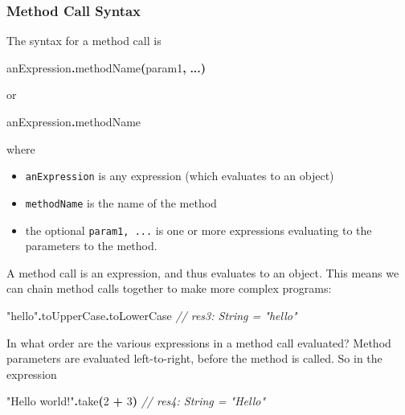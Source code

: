 \documentclass[11pt,a5paper,]{book}
\newenvironment{Shaded}{\begin{snugshade}}{\end{snugshade}}
\newcommand{\CommentTok}[1]{\textcolor[rgb]{0.56,0.35,0.01}{\textit{#1}}}
\newcommand{\DecValTok}[1]{\textcolor[rgb]{0.00,0.00,0.81}{#1}}
\newcommand{\FunctionTok}[1]{\textcolor[rgb]{0.00,0.00,0.00}{#1}}
\newcommand{\NormalTok}[1]{#1}
\newcommand{\OperatorTok}[1]{\textcolor[rgb]{0.81,0.36,0.00}{\textbf{#1}}}
\newcommand{\StringTok}[1]{\textcolor[rgb]{0.31,0.60,0.02}{#1}}
\providecommand{\tightlist}{%
  \setlength{\itemsep}{0pt}\setlength{\parskip}{0pt}}
\begin{document}
\hypertarget{method-call-syntax}{%
\subsubsection*{Method Call Syntax}\label{method-call-syntax}}

The syntax for a method call is

\begin{Shaded}
\begin{Highlighting}[]
\NormalTok{anExpression}\OperatorTok{.}\FunctionTok{methodName}\OperatorTok{(}\NormalTok{param1}\OperatorTok{,} \OperatorTok{...)}
\end{Highlighting}
\end{Shaded}

or

\begin{Shaded}
\begin{Highlighting}[]
\NormalTok{anExpression}\OperatorTok{.}\NormalTok{methodName}
\end{Highlighting}
\end{Shaded}

where

\begin{itemize}
\tightlist
\item
  \texttt{anExpression} is any expression (which evaluates to an object)
\item
  \texttt{methodName} is the name of the method
\item
  the optional \texttt{param1,\ ...} is one or more expressions
  evaluating to the parameters to the method.
\end{itemize}

A method call is an expression, and thus evaluates to an object. This
means we can chain method calls together to make more complex programs:

\begin{Shaded}
\begin{Highlighting}[]
\StringTok{"hello"}\OperatorTok{.}\NormalTok{toUpperCase}\OperatorTok{.}\NormalTok{toLowerCase}
\CommentTok{// res3: String = "hello"}
\end{Highlighting}
\end{Shaded}

In what order are the various expressions in a method call evaluated?
Method parameters are evaluated left-to-right, before the method is
called. So in the expression

\begin{Shaded}
\begin{Highlighting}[]
\StringTok{"Hello world!"}\OperatorTok{.}\FunctionTok{take}\OperatorTok{(}\DecValTok{2} \OperatorTok{+} \DecValTok{3}\OperatorTok{)}
\CommentTok{// res4: String = "Hello"}
\end{Highlighting}
\end{Shaded}
\end{document}
